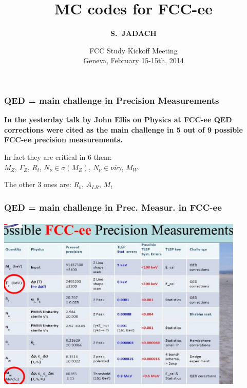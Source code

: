 \documentclass{beamer}
\title[Monte Carlo Methods] %
{ {\bf MC codes for FCC-ee}
} %
\author[S.~Jadach] %
{\Large\bf S.~JADACH }
\institute[Universities of Somewhere and Elsewhere] %
{ {\large\crd IFJ-PAN, Krak\'ow, Poland}\\
  {~~~}\\
  {\footnotesize
  Partly supported by Polish Government grant\\
  {\em Narodowe Centrum Nauki} DEC-2011/03/B/ST2/02632
}}
\date[Short Occasion] %
{\small FCC Study Kickoff Meeting\\
   Geneva,
   February 15-15th, 2014
}
\newcommand{\cbl}{\color{blue}}
\begin{document}
\begin{frame}
  \titlepage
\end{frame}

\begin{frame}[fragile]
\frametitle{\bf QED = main challenge in Precision Measurements}

\Large\bf
In the yesterday talk by John Ellis on Physics at FCC-ee
{\cbl QED corrections} were cited as the main challenge 
{\cbl in 5 out of 9}
possible FCC-ee precision measurements.

\vspace{4mm}
In fact they are critical in 6 them:\\
$M_Z$,\;
$\Gamma_Z$, \;
$R_l$, \;
$N_\nu \in \sigma(M_Z)$, \;
$N_\nu \in \nu\bar\nu\gamma$, \;
$M_W$.

\vspace{3mm}
The other 3 ones are:
$R_b$, \;
$A_{LR}$, \;
$M_{t}$

\end{frame}





\begin{frame}[fragile]
\frametitle{\bf QED = main challenge in Prec. Measur. in FCC-ee}

\vspace{-2mm}
{\includegraphics[width=118mm,height=85mm]{JEllis.jpg}}

\end{frame}
\end{document}
